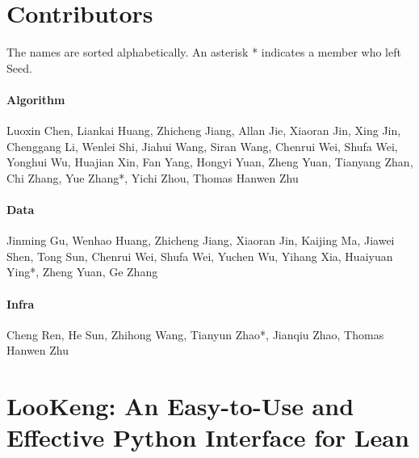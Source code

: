 \section{Contributors}
The names are sorted alphabetically. An asterisk * indicates a member who left Seed.

\paragraph{Algorithm}
Luoxin Chen, Liankai Huang, Zhicheng Jiang, Allan Jie, Xiaoran Jin, Xing Jin, Chenggang Li, Wenlei Shi, Jiahui Wang, Siran Wang, Chenrui Wei, Shufa Wei, Yonghui Wu, Huajian Xin, Fan Yang, Hongyi Yuan, Zheng Yuan, Tianyang Zhan, Chi Zhang, Yue Zhang*, Yichi Zhou, Thomas Hanwen Zhu

\paragraph{Data}
Jinming Gu, Wenhao Huang, Zhicheng Jiang, Xiaoran Jin, Kaijing Ma, Jiawei Shen, Tong Sun, Chenrui Wei, Shufa Wei, Yuchen Wu, Yihang Xia, Huaiyuan Ying*, Zheng Yuan, Ge Zhang

\paragraph{Infra}
Cheng Ren, He Sun, Zhihong Wang, Tianyun Zhao*, Jianqiu Zhao, Thomas Hanwen Zhu

\section{LooKeng: An Easy-to-Use and Effective Python Interface for Lean}
\label{LooKeng}


